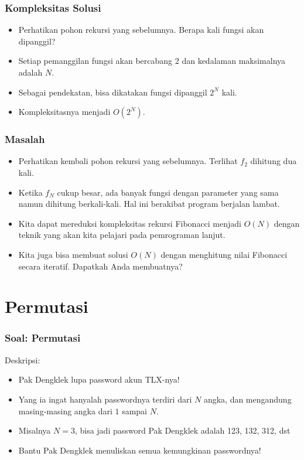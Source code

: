 \begin{frame}
\frametitle{Kompleksitas Solusi}
\begin {itemize}
   \item Perhatikan pohon rekursi yang sebelumnya. Berapa kali fungsi akan dipanggil?
   \item Setiap pemanggilan fungsi akan bercabang 2 dan kedalaman maksimalnya adalah $N$.
   \item Sebagai pendekatan, bisa dikatakan fungsi dipanggil $2^N$ kali.
   \item Kompleksitasnya menjadi $O(2^{N})$.
\end {itemize}
\end{frame}

\begin{frame}
\frametitle{Masalah}
\begin{itemize}
  \item Perhatikan kembali pohon rekursi yang sebelumnya. Terlihat $f_2$ dihitung dua kali.
  \item Ketika $f_N$ cukup besar, ada banyak fungsi dengan parameter yang sama namun dihitung berkali-kali. Hal ini berakibat program berjalan lambat.
  \item Kita dapat mereduksi kompleksitas rekursi Fibonacci menjadi $O(N)$ dengan teknik yang akan kita pelajari pada pemrograman lanjut.
  \item Kita juga bisa membuat solusi $O(N)$ dengan menghitung nilai Fibonacci secara iteratif. Dapatkah Anda membuatnya?
\end{itemize}
\end{frame}

\section{Permutasi}
\frame{\sectionpage}


\begin{frame}
\frametitle{Soal: Permutasi}
Deskripsi:
\begin{itemize}
  \item Pak Dengklek lupa password akun TLX-nya!
  \item Yang ia ingat hanyalah passwordnya terdiri dari $N$ angka, dan mengandung masing-masing angka dari $1$ sampai $N$.
  \item Misalnya $N=3$, bisa jadi password Pak Dengklek adalah 123, 132, 312, dst
  \item Bantu Pak Dengklek menuliskan semua kemungkinan passwordnya!
\end{itemize}
\end{frame}

